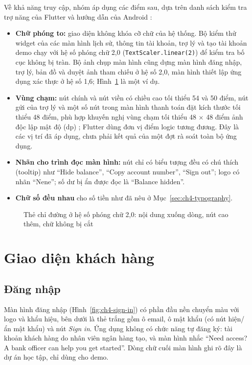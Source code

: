 Về khả năng truy cập, nhóm áp dụng các điểm sau, dựa trên danh sách kiểm tra trợ năng của Flutter và hướng dẫn của Android \parencite{ch4-flutter-a11y,ch4-android-a11y}:
\begin{itemize}
  \item \textbf{Chữ phóng to:} giao diện không khóa cỡ chữ của hệ thống. Bộ kiểm thử widget của các màn hình lịch sử, thông tin tài khoản, trợ lý và tạo tài khoản demo chạy với hệ số phóng chữ 2,0 (\texttt{TextScaler.\allowbreak{}linear(2)}) để kiểm tra bố cục không bị tràn. Bộ ảnh chụp màn hình cũng dựng màn hình đăng nhập, trợ lý, bản đồ và duyệt ảnh tham chiếu ở hệ số 2,0, màn hình thiết lập ứng dụng xác thực ở hệ số 1,6; Hình~\ref{fig:ch4-large-text} là một ví dụ.
  \item \textbf{Vùng chạm:} nút chính và nút viền có chiều cao tối thiểu 54 và 50 điểm, nút gửi của trợ lý và một số nút trong màn hình thanh toán đặt kích thước tối thiểu 48 điểm, phù hợp khuyến nghị vùng chạm tối thiểu 48 $\times$ 48 điểm ảnh độc lập mật độ (dp) \parencite{ch4-android-a11y}; Flutter dùng đơn vị điểm logic tương đương. Đây là các vị trí đã áp dụng, chưa phải kết quả của một đợt rà soát toàn bộ ứng dụng.
  \item \textbf{Nhãn cho trình đọc màn hình:} nút chỉ có biểu tượng đều có chú thích (tooltip) như ``Hide balance'', ``Copy account number'', ``Sign out''; logo có nhãn ``Nene''; số dư bị ẩn được đọc là ``Balance hidden''.
  \item \textbf{Chữ số đều nhau} cho số tiền như đã nêu ở Mục~\ref{sec:ch4-typography}.
\end{itemize}

\begin{figure}[H]
\centering
{}
\caption{Thẻ chỉ đường ở hệ số phóng chữ 2,0: nội dung xuống dòng, nút cao thêm, chữ không bị cắt}
\label{fig:ch4-large-text}
\end{figure}

\section{Giao diện khách hàng}
\label{sec:ch4-customer}

\subsection{Đăng nhập}
\label{sec:ch4-sign-in}

Màn hình đăng nhập (Hình~\ref{fig:ch4-sign-in}) có phần đầu nền chuyển màu với logo và khẩu hiệu, bên dưới là thẻ trắng gồm ô email, ô mật khẩu (có nút hiện/ẩn mật khẩu) và nút \textit{Sign in}. Ứng dụng không có chức năng tự đăng ký: tài khoản khách hàng do nhân viên ngân hàng tạo, và màn hình nhắc ``Need access? A bank officer can help you get started''. Dòng chữ cuối màn hình ghi rõ đây là dự án học tập, chỉ dùng cho demo.

